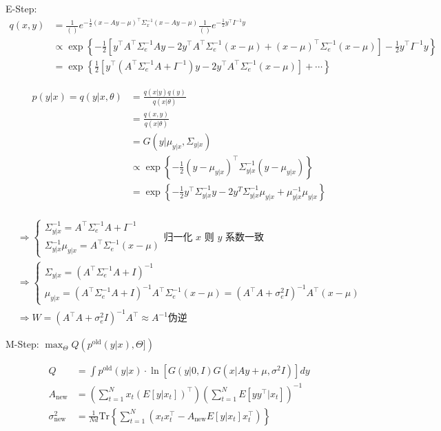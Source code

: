 E-Step: 
\begin{align*}
	q(x,y) &= \frac{1}{()}e^{-\frac{1}{2}(x-Ay-\mu)^\top\Sigma_x^{-1}(x-Ay-\mu)}\frac{1}{()}e^{-\frac{1}{2}y^\top I^{-1}y}\\
	&\propto \exp\left\{-\frac{1}{2}\left[y^\top A^\top \Sigma_e^{-1} Ay - 2y^\top A^\top \Sigma_e^{-1}(x-\mu) + (x-\mu)^\top\Sigma_e^{-1}(x-\mu)\right]-\frac{1}{2}y^\top I^{-1}y
	\right\}\\
	&=\exp\left\{\frac{1}{2}\left[y^\top(A^\top\Sigma_e^{-1}A+I^{-1})y-2y^\top A^\top \Sigma_e^{-1}(x-\mu)\right] + \cdots\right\}
\end{align*}

\begin{align*}
p(y|x)=q(y|x,\theta)&=\frac{q(x|y)q(y)}{q(x|\theta)}\\
&=\frac{q(x,y)}{q(x|\theta)}\\
&=G(y|\mu_{y|x},\Sigma_{y|x})\\
&\propto \exp\left\{-\frac{1}{2}(y-\mu_{y|x})^\top\Sigma_{y|x}^{-1}(y-\mu_{y|x})\right\}\\
&=\exp\left\{-\frac{1}{2}y^\top\Sigma_{y|x}^{-1}y-2y^T\Sigma_{y|x}^{-1}\mu_{y|x}+\mu_{y|x}^{-1}\mu_{y|x} \right\}\\
\end{align*}

\begin{align*}
	&\Rightarrow \begin{cases}
		\Sigma_{y|x}^{-1} = A^\top\Sigma_e^{-1}A + I^{-1}\\
		\Sigma_{y|x}^{-1}\mu_{y|x}=A^\top\Sigma_e^{-1}(x-\mu)
	\end{cases} \text{归一化 $x$ 则 $y$ 系数一致}\\
	&\Rightarrow \begin{cases}
		\Sigma_{y|x} = (A^\top\Sigma_e^{-1}A + I)^{-1}\\
		\mu_{y|x} = (A^\top \Sigma_e^{-1} A +I)^{-1}A^\top \Sigma_e^{-1}(x-\mu) = (A^\top A+\sigma_e^2 I)^{-1}A^\top (x-\mu)
	\end{cases}\\
	&\Rightarrow W = (A^\top A+\sigma_e^2 I)^{-1}A^\top \approx A^{-1}\text{伪逆}
\end{align*}

M-Step:
$\max_\Theta Q(p^\text{old}(y|x),\Theta])$

\begin{align*}
	Q &= \int p^\text{old}(y|x)\cdot\ln[G(y|0,I)G(x|Ay+\mu,\sigma^2 I)]dy\\
	A_\text{new}&=\left(\sum_{t=1}^N x_t(E[y|x_t])^\top\right)\left(\sum_{t=1}^N E[yy^\top|x_t]\right)^{-1}\\
	\sigma^2_\text{new}&=\frac{1}{Nd}\text{Tr}\left\{\sum_{t=1}^N(x_tx_t^\top-A_\text{new}E[y|x_t]x_t^\top)\right\}
\end{align*}

